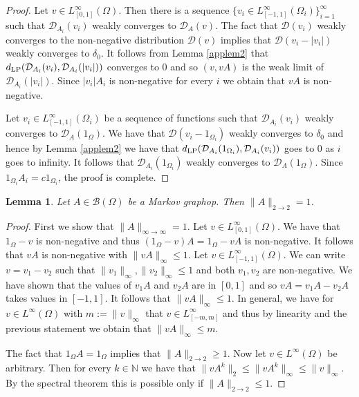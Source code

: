 \documentclass[a4wider]{amsart}
\newtheorem{lemma}[theorem]{Lemma}
\theoremstyle{definitionbreak}\newtheorem{D}[theorem]{Definition}
\theoremstyle{definitionbreak}\newtheorem*{D*}{Definition}
\begin{document}
\begin{proof} Let $v\in L^\infty_{[0,1]}(\Omega)$. Then there is a sequence $\{v_i\in L_{[-1,1]}^\infty(\Omega_i)\}_{i=1}^\infty$  such that $\mathcal{D}_{A_i}(v_i)$ weakly converges to $\mathcal{D}_A(v)$. The fact that $\mathcal{D}(v_i)$ weakly converges to the non-negative distribution $\mathcal{D}(v)$ implies that $\mathcal{D}(v_i-|v_i|)$ weakly converges to $\delta_0$. It follows from Lemma \ref{applem2} that $d_{\rm LP}(\mathcal{D}_{A_i}(v_i),\mathcal{D}_{A_i}(|v_i|))$ converges to $0$ and so $(v,vA)$ is the weak limit of $\mathcal{D}_{A_i}(|v_i|)$. Since $|v_i|A_i$ is non-negative for every $i$  we obtain that $vA$ is non-negative. 

Let $v_i\in L_{[-1,1]}^\infty(\Omega_i)$ be a sequence of functions such that $\mathcal{D}_{A_i}(v_i)$ weakly converges to $\mathcal{D}_A(1_\Omega)$. We have that $\mathcal{D}(v_i-1_{\Omega_i})$ weakly converges to $\delta_0$ and hence by Lemma \ref{applem2} we have that $d_{\rm LP}(\mathcal{D}_{A_i}(1_{\Omega_i}),\mathcal{D}_{A_i}(v_i))$ goes to $0$ as $i$ goes to infinity. It follows that $\mathcal{D}_{A_i}(1_{\Omega_i})$ weakly converges to $\mathcal{D}_A(1_\Omega)$. Since $1_{\Omega_i} A_i=c1_{\Omega_i}$, the proof is complete.
\end{proof}


\begin{lemma}\label{closedprop3} Let $A\in\mathcal{B}(\Omega)$ be a Markov graphop. Then $\|A\|_{2\to 2}=1$. 
\end{lemma}

\begin{proof}  First we show that $\|A\|_{\infty\to\infty}=1$.
Let $v\in L_{[0,1]}^\infty(\Omega)$. We have that $1_\Omega-v$ is non-negative and thus $(1_\Omega-v)A=1_\Omega-vA$ is non-negative. It follows that $vA$ is non-negative with $\|vA\|_\infty\leq 1$. Let $v\in L^\infty_{[-1,1]}(\Omega)$. We can write $v=v_1-v_2$ such that $\|v_1\|_\infty,\|v_2\|_\infty\leq 1$ and both $v_1,v_2$ are non-negative. We have shown that the values of $v_1A$ and $v_2A$ are in $[0,1]$ and so $vA=v_1A-v_2A$ takes values in $[-1,1]$. It follows that $\|vA\|_\infty\leq 1$. In general, we have for $v\in L^\infty(\Omega)$ with $m:=\|v\|_\infty$ that $v\in L^\infty_{[-m,m]}$ and thus by linearity and the previous statement we obtain that $\|vA\|_\infty\leq m.$


The fact that $1_\Omega A=1_\Omega$ implies that $\|A\|_{2\to 2}\geq 1$. Now let $v\in L^\infty(\Omega)$ be arbitrary. Then for every $k\in\mathbb{N}$ we have that $\|vA^k\|_2\leq\|vA^k\|_\infty\leq\|v\|_\infty$. By the spectral theorem this is  possible only if $\|A\|_{2\to 2}\leq 1$.
\end{proof}
\end{document}
